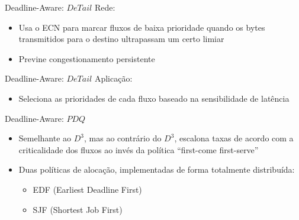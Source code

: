 \documentclass[aspectratio=169]{beamer}
\begin{document}
	\begin{frame} {Deadline-Aware: $DeTail$}
		Rede:
		\begin{itemize}
		 	\item
		 		Usa o ECN para marcar fluxos de baixa prioridade quando os bytes transmitidos para o destino ultrapassam um certo limiar
		 	\item
				Previne congestionamento persistente
		 \end{itemize}
	\end{frame}

	\begin{frame} {Deadline-Aware: $DeTail$}
		Aplicação:
		\begin{itemize}
		 	\item
		 		Seleciona as prioridades de cada fluxo baseado na sensibilidade de latência
		 \end{itemize}
	\end{frame}

	\begin{frame} {Deadline-Aware: $PDQ$}
		\begin{itemize}
		 	\item
		 		Semelhante ao $D^3$, mas ao contrário do $D^3$, escalona taxas de acordo com a criticalidade dos fluxos ao invés da política “first-come first-serve”
		 	\item
		 		Duas políticas de alocação, implementadas de forma totalmente distribuída:
				\begin{itemize}
				 	\item
				 		EDF (Earliest Deadline First)
				 	\item
						SJF (Shortest Job First)
				 \end{itemize}
		\end{itemize}
	\end{frame}
\end{document}
